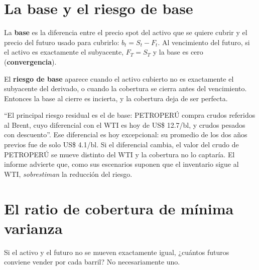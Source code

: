 \section{La base y el riesgo de base}

\begin{definicion}[Base]
La \textbf{base} es la diferencia entre el precio spot del activo que se quiere cubrir y el precio del futuro usado para cubrirlo: $b_t=S_t-F_t$. Al vencimiento del futuro, si el activo es exactamente el subyacente, $F_T=S_T$ y la base es cero (\textbf{convergencia}).
\end{definicion}

El \textbf{riesgo de base} aparece cuando el activo cubierto no es exactamente el subyacente del derivado, o cuando la cobertura se cierra antes del vencimiento. Entonces la base al cierre es incierta, y la cobertura deja de ser perfecta.

\begin{informe}
\enquote{El principal riesgo residual es el de base: PETROPERÚ compra crudos referidos al Brent, cuyo diferencial con el WTI es hoy de US\$ 12.7/bl, y crudos pesados con descuento}. Ese diferencial es hoy excepcional: su promedio de los dos años previos fue de solo US\$ 4.1/bl. Si el diferencial cambia, el valor del crudo de PETROPERÚ se mueve distinto del WTI y la cobertura no lo captaría. El informe advierte que, como sus escenarios suponen que el inventario sigue al WTI, \emph{sobrestiman} la reducción del riesgo.
\end{informe}

\section{El ratio de cobertura de mínima varianza}

Si el activo y el futuro no se mueven exactamente igual, ¿cuántos futuros conviene vender por cada barril? No necesariamente uno.

